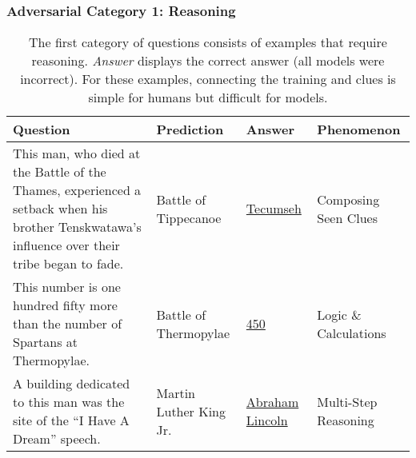 \subsubsection{Adversarial Category 1: Reasoning}
\label{sec:compose_knowledge}


\begin{table*}[t]
\centering
\begin{tabular}{p{6.5cm}llp{2cm}}
\hline
         Question    & Prediction & Answer & Phenomenon                  \\ \hline

This man, who died at the Battle of the Thames, experienced a setback when his brother Tenskwatawa's influence over their tribe began to fade. & Battle of Tippecanoe & \underline{Tecumseh} & Composing Seen Clues \\ \hline

This number is one hundred fifty more than the number of Spartans at Thermopylae. & Battle of Thermopylae & \underline{450} & Logic \& Calculations \\ \hline

A building dedicated to this man was the site of the ``I Have A Dream'' speech. & Martin Luther King Jr. & \underline{Abraham Lincoln} & Multi-Step Reasoning \\ \hline

\end{tabular}
\caption{The first category of \challenge{} questions consists of examples that require reasoning. \emph{Answer} displays the correct answer (all models were incorrect). For these examples, connecting the training and \challenge{} clues is simple for humans but difficult for models.}
\label{table:unseen_sample}
\end{table*}

